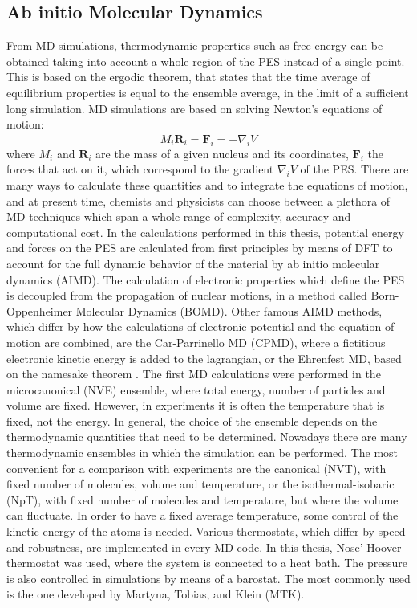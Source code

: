 \subsection*{Ab initio Molecular Dynamics}
From MD simulations, thermodynamic properties such as free energy can be obtained taking into account a whole region of the PES instead of a single point. This is based on the ergodic theorem, that states that the time average of equilibrium properties is equal to the ensemble average, in the limit of a sufficient long simulation. MD simulations are based on solving Newton’s equations of motion:
\[
M_i \ddot{\mathbf{R}}_i = \mathbf{F}_i = - \nabla_i V
\]
where $M_i$ and $\mathbf{R}_i$ are the mass of a given nucleus and its coordinates, $\mathbf{F}_i$ the forces that act on it, which correspond to the gradient $\nabla_i V$ of the PES. There are many ways to calculate these quantities and to integrate the equations of motion, and at present time, chemists and physicists can choose between a plethora of MD techniques which span a whole range of complexity, accuracy and computational cost. 
In the calculations performed in this thesis, potential energy and forces on the PES are calculated from first principles by means of DFT to account for the full dynamic behavior of the material by ab initio molecular dynamics (AIMD). The calculation of electronic properties which define the PES is decoupled from the propagation of nuclear motions, in a method called Born-Oppenheimer Molecular Dynamics (BOMD). Other famous AIMD methods, which differ by how the calculations of electronic potential and the equation of motion are combined, are the Car-Parrinello MD (CPMD)\cite{Car1985}, where a fictitious electronic kinetic energy is added to the lagrangian, or the Ehrenfest MD, based on the namesake theorem \cite{Ehrenfest1927, Marx2009}. The first MD calculations were performed in the microcanonical (NVE) ensemble, where total energy, number of particles and volume are fixed. However, in experiments it is often the temperature that is fixed, not the energy. In general, the choice of the ensemble depends on the thermodynamic quantities that need to be determined. Nowadays there are many thermodynamic ensembles in which the simulation can be performed. The most convenient for a comparison with experiments are the canonical (NVT), with fixed number of molecules, volume and temperature, or the isothermal-isobaric (NpT), with fixed number of molecules and temperature, but where the volume can fluctuate. In order to have a fixed average temperature, some control of the kinetic energy of the atoms is needed. Various thermostats, which differ by speed and robustness, are implemented in every MD code. In this thesis, Nose’-Hoover thermostat was used, where the system is connected to a heat bath. The pressure is also controlled in simulations by means of a barostat. The most commonly used is the one developed by Martyna, Tobias, and Klein (MTK)\cite{Martyna1994}.

